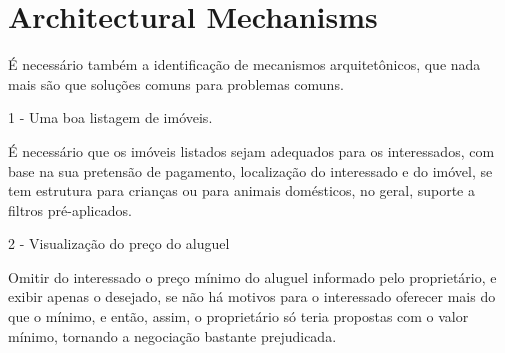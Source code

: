 \section*{Architectural Mechanisms}

É necessário também a identificação de mecanismos arquitetônicos, que nada mais são que soluções comuns para problemas comuns.

1 - Uma boa listagem de imóveis.

É necessário que os imóveis listados sejam adequados para os interessados, com base na sua pretensão de pagamento, localização do interessado e do imóvel, se tem estrutura para crianças ou para animais domésticos, no geral, suporte a filtros pré-aplicados.

2 - Visualização do preço do aluguel

Omitir do interessado o preço mínimo do aluguel informado pelo proprietário, e exibir apenas o desejado, se não há motivos para o interessado oferecer mais do que o mínimo, e então, assim, o proprietário só teria propostas com o valor mínimo, tornando a negociação bastante prejudicada.

